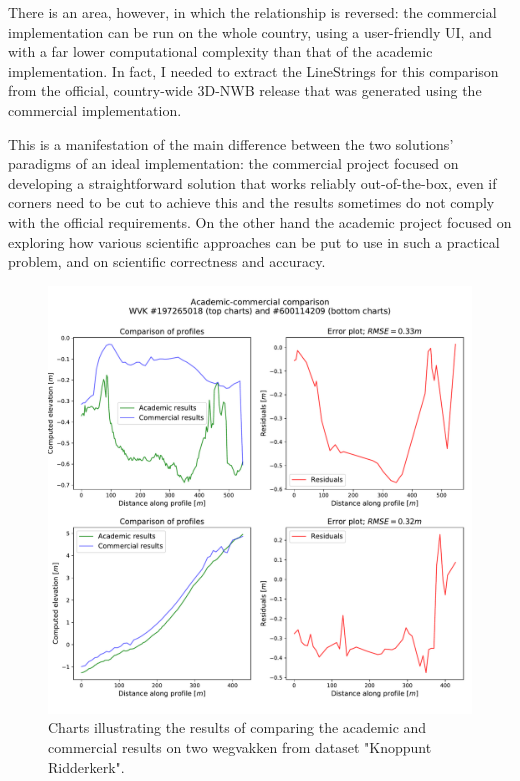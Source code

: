 There is an area, however, in which the relationship is reversed: the commercial implementation can be run on the whole country, using a user-friendly UI, and with a far lower computational complexity than that of the academic implementation. In fact, I needed to extract the LineStrings for this comparison from the official, country-wide 3D-NWB release that was generated using the commercial implementation.

This is a manifestation of the main difference between the two solutions' paradigms of an ideal implementation: the commercial project focused on developing a straightforward solution that works reliably out-of-the-box, even if corners need to be cut to achieve this and the results sometimes do not comply with the official requirements. On the other hand the academic project focused on exploring how various scientific approaches can be put to use in such a practical problem, and on scientific correctness and accuracy.

\begin{figure}
    \centering
    \includegraphics[width=\linewidth]{final_report/figs/commercialcomparison2.pdf}
    \caption{Charts illustrating the results of comparing the academic and commercial results on two wegvakken from dataset "Knoppunt Ridderkerk".}
    \label{fig:commercialcomparison2}
\end{figure}

